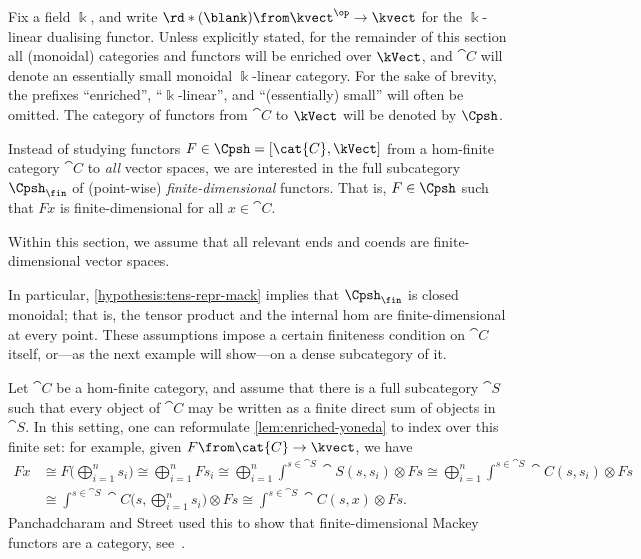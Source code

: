 \begin{hypothesis}\label{hypo:eso-enriched}
  Fix a field \(\Bbbk\),
  and write \(\rd*{(\blank)}\from \kvect^{\op} \to \kvect\) for the \(\Bbbk\)\hyp{}linear dualising functor.
  Unless explicitly stated,
  for the remainder of this section
  all (monoidal) categories and functors will be enriched over \(\kVect\),
  and \(\cat{C}\) will denote an essentially small monoidal \(\Bbbk\)\hyp{}linear category.
  For the sake of brevity, the prefixes ``enriched'', ``\(\Bbbk\)\hyp{}linear'', and ``(essentially) small'' will often be omitted.
  The category of functors from \(\cat{C}\) to \(\kVect\) will be denoted by \(\Cpsh\).
\end{hypothesis}

Instead of studying functors \(F \in \Cpsh = [\cat{C}, \kVect]\)
from a hom-finite category \(\cat{C}\) to \emph{all} vector spaces,
we are interested in the full subcategory \(\Cpsh_{\fin}\) of (point-wise)
\emph{finite\hyp{}dimensional} functors.
That is, \(F \in \Cpsh\) such that \(Fx\) is finite-dimen\-sional for all \(x \in \cat{C}\).

\begin{hypothesis}\label{hypothesis:tens-repr-mack}
  Within this section, we assume that all relevant ends and coends are finite\hyp{}dimensional vector spaces.
\end{hypothesis}

In particular, \cref{hypothesis:tens-repr-mack}
implies that \(\Cpsh_{\fin}\) is closed monoidal;
that is, the tensor product and the internal hom are finite\hyp{}dimensional at every point.
These assumptions impose a certain finiteness condition on \(\cat{C}\) itself, or—as the next example will show—on a dense
subcategory of it.

\begin{example}\label{ex:mackey-dense-subcategories}
  Let \(\cat{C}\) be a hom-finite category,
  and assume that there is a full subcategory \(\cat{S}\) such that every object of \(\cat{C}\) may be written as a finite direct sum of objects in \(\cat{S}\).
  In this setting, one can reformulate \cref{lem:enriched-yoneda} to index over this finite set:
  for example, given \(F\from \cat{C}\to \kvect\), we have
  \begin{align*}
    Fx &\cong F\Big(\!\bigoplus_{i = 1}^n s_i\Big)
         \cong \bigoplus_{i = 1}^n Fs_i
         \cong \bigoplus_{i = 1}^n \int^{s \in \cat{S}}\!\! \cat{S}(s, s_i) \otimes Fs
         \cong \bigoplus_{i = 1}^n \int^{s \in \cat{S}}\!\! \cat{C}(s, s_i) \otimes Fs \\
       &\cong \int^{s \in \cat{S}}\!\! \cat{C}\Big(s, \bigoplus_{i = 1}^n s_i\Big) \otimes Fs
         \cong \int^{s \in \cat{S}}\!\! \cat{C}(s, x) \otimes Fs.
  \end{align*}
  Panchadcharam and Street used this to show that finite\hyp{}dimensional Mackey functors are a \GV{} category, see~\cite[Section~9]{panchadcharam07:mackey}.
\end{example}

